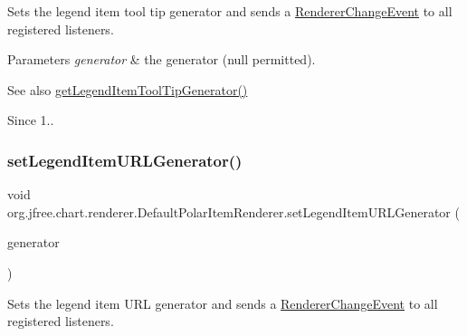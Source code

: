 Sets the legend item tool tip generator and sends a \mbox{\hyperlink{}{Renderer\+Change\+Event}} to all registered listeners.


\begin{DoxyParams}{Parameters}
{\em generator} & the generator ({\ttfamily null} permitted).\\
\hline
\end{DoxyParams}
\begin{DoxySeeAlso}{See also}
\mbox{\hyperlink{classorg_1_1jfree_1_1chart_1_1renderer_1_1_default_polar_item_renderer_aa4a460957ed7dc7bbb9aff598f01958c}{get\+Legend\+Item\+Tool\+Tip\+Generator()}} 
\end{DoxySeeAlso}
\begin{DoxySince}{Since}
1.. 
\end{DoxySince}
\mbox{\label{classorg_1_1jfree_1_1chart_1_1renderer_1_1_default_polar_item_renderer_a38cde3541e3a1b237ffad39b0464e335}} 
\subsubsection{\texorpdfstring{set\+Legend\+Item\+U\+R\+L\+Generator()}{setLegendItemURLGenerator()}}
{\footnotesize\ttfamily void org.\+jfree.\+chart.\+renderer.\+Default\+Polar\+Item\+Renderer.\+set\+Legend\+Item\+U\+R\+L\+Generator (\begin{DoxyParamCaption}\item[{\mbox{\hyperlink{interfaceorg_1_1jfree_1_1chart_1_1labels_1_1_x_y_series_label_generator}{X\+Y\+Series\+Label\+Generator}}}]{generator }\end{DoxyParamCaption})}

Sets the legend item U\+RL generator and sends a \mbox{\hyperlink{}{Renderer\+Change\+Event}} to all registered listeners.


